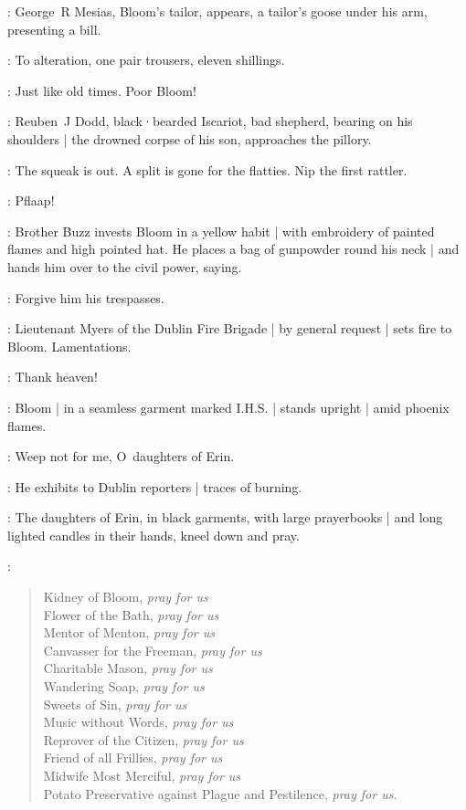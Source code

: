 :
George~R Mesias,
Bloom's tailor,
appears,
a tailor's goose under his arm,
presenting a bill.

\Mesias:
To alteration,
one pair trousers,
eleven shillings.

\Bloom:
Just like old times.
Poor Bloom!

:
Reuben~J Dodd,
black·bearded Iscariot,
bad shepherd,
bearing on his shoulders |
the drowned corpse of his son,
approaches the pillory.%

\ReubenJ:
The squeak is out.
A split is gone for the flatties.
Nip the first rattler.

\FireBrigade:
Pflaap!

:
Brother Buzz invests Bloom in a yellow habit |
with embroidery of painted flames and high pointed hat.
He places a bag of gunpowder round his neck |
and hands him over to the civil power,
saying.

\BrotherBuzz:
Forgive him his trespasses.

:
Lieutenant Myers of the Dublin Fire Brigade |
by general request |
sets fire to Bloom.
Lamentations.

\Citizen[1]:
Thank heaven!

:
Bloom |
in a seamless garment marked I.H.S. |
stands upright |
amid phoenix flames.

\Bloom:
Weep not for me,
O~daughters of Erin.

:
He exhibits to Dublin reporters |
traces of burning.

:
The daughters of Erin,
in black garments,
with large prayerbooks |
and long lighted candles in their hands,
kneel down and pray.

\DaughtersErin:
\begin{verse}
    Kidney of Bloom, \emph{pray for us}\\
    Flower of the Bath, \emph{pray for us}\\
    Mentor of Menton, \emph{pray for us}\\
    Canvasser for the Freeman, \emph{pray for us}\\
    Charitable Mason, \emph{pray for us}\\
    Wandering Soap, \emph{pray for us}\\
    Sweets of Sin, \emph{pray for us}\\
    Music without Words, \emph{pray for us}\\
    Reprover of the Citizen, \emph{pray for us}\\
%
    Friend of all Frillies, \emph{pray for us}\\
    Midwife Most Merciful, \emph{pray for us}\\
    Potato Preservative against Plague and Pestilence, \emph{pray for us}.
\end{verse}

